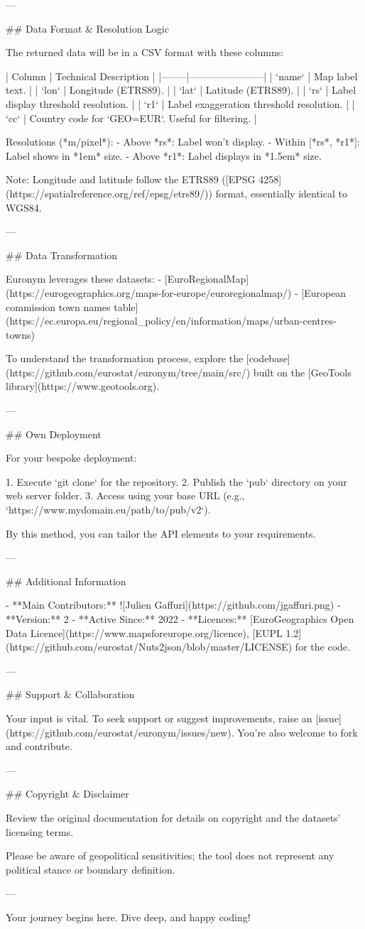 ---

## Data Format & Resolution Logic

The returned data will be in a CSV format with these columns:

| Column | Technical Description |
|--------|-----------------------|
| `name` | Map label text.       |
| `lon`  | Longitude (ETRS89).   |
| `lat`  | Latitude (ETRS89).    |
| `rs`   | Label display threshold resolution. |
| `r1`   | Label exaggeration threshold resolution. |
| `cc`   | Country code for `GEO=EUR`. Useful for filtering. |

Resolutions (*m/pixel*): 
- Above *rs*: Label won't display.
- Within [*rs*, *r1*]: Label shows in *1em* size.
- Above *r1*: Label displays in *1.5em* size.

Note: Longitude and latitude follow the ETRS89 ([EPSG 4258](https://spatialreference.org/ref/epsg/etrs89/)) format, essentially identical to WGS84.

---

## Data Transformation

Euronym leverages these datasets:
- [EuroRegionalMap](https://eurogeographics.org/maps-for-europe/euroregionalmap/)
- [European commission town names table](https://ec.europa.eu/regional_policy/en/information/maps/urban-centres-towns)

To understand the transformation process, explore the [codebase](https://github.com/eurostat/euronym/tree/main/src/) built on the [GeoTools library](https://www.geotools.org).

---

## Own Deployment

For your bespoke deployment:

1. Execute `git clone` for the repository.
2. Publish the `pub` directory on your web server folder.
3. Access using your base URL (e.g., `https://www.mydomain.eu/path/to/pub/v2`).

By this method, you can tailor the API elements to your requirements.

---

## Additional Information

- **Main Contributors:** ![Julien Gaffuri](https://github.com/jgaffuri.png)
- **Version:** 2
- **Active Since:** 2022
- **Licences:** [EuroGeographics Open Data Licence](https://www.mapsforeurope.org/licence), [EUPL 1.2](https://github.com/eurostat/Nuts2json/blob/master/LICENSE) for the code.

---

## Support & Collaboration

Your input is vital. To seek support or suggest improvements, raise an [issue](https://github.com/eurostat/euronym/issues/new). You're also welcome to fork and contribute.

---

## Copyright & Disclaimer

Review the original documentation for details on copyright and the datasets' licensing terms.

Please be aware of geopolitical sensitivities; the tool does not represent any political stance or boundary definition.

---

Your journey begins here. Dive deep, and happy coding!